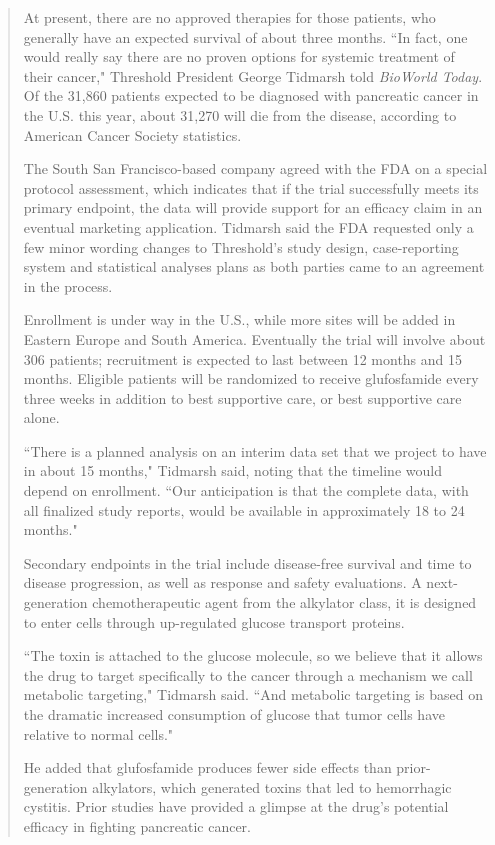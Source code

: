 \begin{singlespace}
\begin{small}
\begin{quotation}
At present, there are no approved therapies for those patients, who generally have an expected survival of about three months. ``In fact, one would really say there are no proven options for systemic treatment of their cancer," Threshold President George Tidmarsh told \emph{BioWorld Today}. Of the 31,860 patients expected to be diagnosed with pancreatic cancer in the U.S. this year, about 31,270 will die from the disease, according to American Cancer Society statistics.

The South San Francisco-based company agreed with the FDA on a special protocol assessment, which indicates that if the trial successfully meets its primary endpoint, the data will provide support for an efficacy claim in an eventual marketing application. Tidmarsh said the FDA requested only a few minor wording changes to Threshold's study design, case-reporting system and statistical analyses plans as both parties came to an agreement in the process.

Enrollment is under way in the U.S., while more sites will be added in Eastern Europe and South America. Eventually the trial will involve about 306 patients; recruitment is expected to last between 12 months and 15 months. Eligible patients will be randomized to receive glufosfamide every three weeks in addition to best supportive care, or best supportive care alone.

``There is a planned analysis on an interim data set that we project to have in about 15 months," Tidmarsh said, noting that the timeline would depend on enrollment. ``Our anticipation is that the complete data, with all finalized study reports, would be available in approximately 18 to 24 months."

Secondary endpoints in the trial include disease-free survival and time to disease progression, as well as response and safety evaluations. A next-generation chemotherapeutic agent from the alkylator class, it is designed to enter cells through up-regulated glucose transport proteins.

``The toxin is attached to the glucose molecule, so we believe that it allows the drug to target specifically to the cancer through a mechanism we call metabolic targeting," Tidmarsh said. ``And metabolic targeting is based on the dramatic increased consumption of glucose that tumor cells have relative to normal cells."

He added that glufosfamide produces fewer side effects than prior-generation alkylators, which generated toxins that led to hemorrhagic cystitis. Prior studies have provided a glimpse at the drug's potential efficacy in fighting pancreatic cancer.


\end{quotation}
\end{small}
\end{singlespace}
